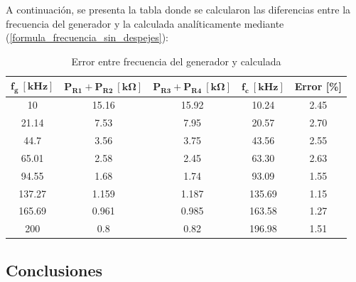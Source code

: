A continuación, se presenta la tabla donde se calcularon las diferencias entre la frecuencia del generador y la calculada analíticamente mediante (\ref{formula_frecuencia_sin_despejes}):
\begin{table}[H]
\centering
\begin{tabular}{ccccc}
\hline
$\mathbf{f_g \ [kHz]}$ & $\mathbf{P_{R1} + P_{R2} \ [k\Omega]}$ & $\mathbf{P_{R3} + P_{R4} \ [k\Omega]}$ & $\mathbf{f_c \ [kHz]}$ & \textbf{Error [\%]} \\
\hline
10                     & 15.16                                  & 15.92                                  & 10.24                  & 2.45                \\
21.14                  & 7.53                                   & 7.95                                   & 20.57                  & 2.70                \\
44.7                   & 3.56                                   & 3.75                                   & 43.56                  & 2.55                \\
65.01                  & 2.58                                   & 2.45                                   & 63.30                  & 2.63                \\
94.55                  & 1.68                                   & 1.74                                   & 93.09                  & 1.55                \\
137.27                 & 1.159                                  & 1.187                                  & 135.69                 & 1.15                \\
165.69                 & 0.961                                  & 0.985                                  & 163.58                 & 1.27                \\
200                    & 0.8                                    & 0.82                                   & 196.98                 & 1.51   				\\
\hline            
\end{tabular}
\caption{Error entre frecuencia del generador y calculada}
\label{tab:Tabla_error}
\end{table}

\subsection{Conclusiones}

